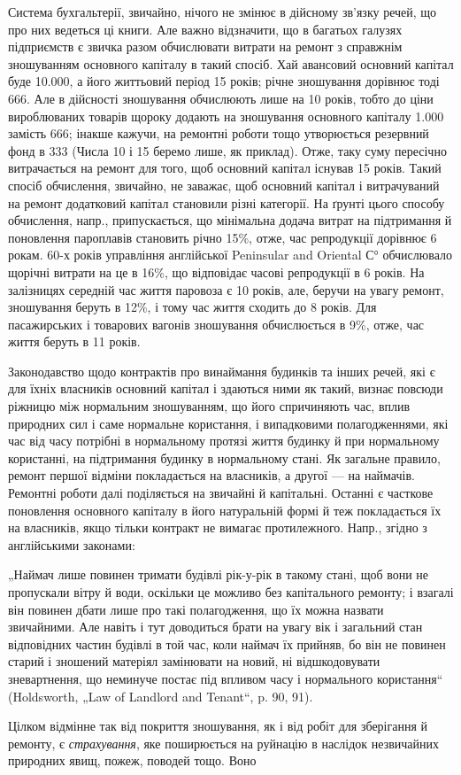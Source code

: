 Система бухгальтерії, звичайно, нічого не змінює в дійсному зв’язку речей, що про них ведеться ці
книги. Але важно відзначити, що в багатьох
галузях підприємств є звичка разом обчислювати витрати на ремонт з справжнім зношуванням
основного капіталу в такий спосіб. Хай авансовий основний капітал буде \num{10.000}, а його
життьовий період 15 років; річне зношування дорівнює тоді 666. Але в дійсності
зношування обчислюють лише на 10 років, тобто до ціни вироблюваних товарів щороку додають на
зношування основного капіталу \num{1.000} замість 666; інакше кажучи, на ремонтні
роботи тощо утворюється резервний фонд в 333 (Числа 10 і 15 беремо лише, як приклад).
Отже, таку суму пересічно витрачається на ремонт для того, щоб основний капітал існував 15 років.
Такий спосіб обчислення, звичайно, не заважає, щоб основний капітал і витрачуваний на ремонт
додатковий капітал становили різні категорії. На ґрунті цього способу обчислення, напр.,
припускається, що мінімальна додача витрат на підтримання й поновлення пароплавів становить річно
15\%, отже, час репродукції дорівнює 6 рокам. 60-х років управління англійської Peninsular and
Oriental С° обчислювало щорічні витрати на це в 16\%, що відповідає часові репродукції в 6 років.
На залізницях середній час життя паровоза є 10 років, але, беручи на увагу ремонт, зношування беруть
в 12\%, і тому час життя сходить до 8 років. Для пасажирських і товарових вагонів зношування
обчислюється в 9\%, отже, час життя беруть в 11 років.

Законодавство щодо контрактів про винаймання будинків та інших речей, які є для їхніх власників
основний капітал і здаються ними як такий, визнає повсюди ріжницю між нормальним зношуванням, що
його спричиняють час, вплив природних сил і саме нормальне користання, і випадковими полагодженнями,
які час від часу потрібні в нормальному протязі життя будинку й при нормальному користанні, на
підтримання будинку в нормальному стані. Як загальне правило, ремонт першої відміни покладається на
власників, а другої — на наймачів. Ремонтні роботи далі поділяється на звичайні й капітальні.
Останні є часткове поновлення основного капіталу в його натуральній формі й теж покладається їх на
власників, якщо тільки контракт не вимагає протилежного. Напр., згідно з англійськими законами:

„Наймач лише повинен тримати будівлі рік-у-рік в такому стані, щоб вони не пропускали вітру й води,
оскільки це можливо без капітального ремонту; і взагалі він повинен дбати лише про такі
полагодження, що їх можна назвати звичайними. Але навіть і тут доводиться брати на увагу вік і
загальний стан відповідних частин будівлі в той час, коли наймач їх прийняв, бо він не повинен
старий і зношений матеріял замінювати на новий, ні відшкодовувати зневартнення, що неминуче постає
під впливом часу і нормального користання“ (Holdsworth, „Law of Landlord and Tenant“, p. 90, 91).

Цілком відмінне так від покриття зношування, як і від робіт для зберігання й ремонту, є \emph{страхування},
яке поширюється на руйнацію в наслідок незвичайних природних явищ, пожеж, поводей тощо. Воно
\parbreak{}  %
